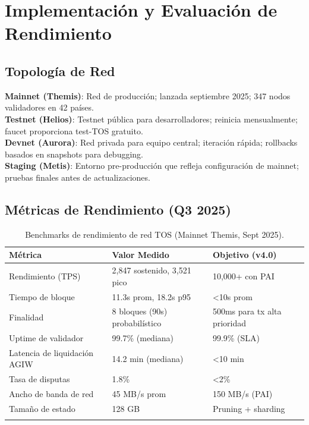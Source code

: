 \documentclass[11pt]{article}
\begin{document}
\section{Implementación y Evaluación de Rendimiento}
\label{sec:implementation}

\subsection{Topología de Red}

\textbf{Mainnet (Themis)}: Red de producción; lanzada septiembre 2025; 347 nodos validadores en 42 países.\\
\textbf{Testnet (Helios)}: Testnet pública para desarrolladores; reinicia mensualmente; faucet proporciona test-TOS gratuito.\\
\textbf{Devnet (Aurora)}: Red privada para equipo central; iteración rápida; rollbacks basados en snapshots para debugging.\\
\textbf{Staging (Metis)}: Entorno pre-producción que refleja configuración de mainnet; pruebas finales antes de actualizaciones.

\subsection{Métricas de Rendimiento (Q3 2025)}

\begin{longtable}{@{}p{}p{}p{}@{}}
\toprule
\textbf{Métrica} & \textbf{Valor Medido} & \textbf{Objetivo (v4.0)} \\\midrule
Rendimiento (TPS) & 2,847 sostenido, 3,521 pico & 10,000+ con PAI \\
Tiempo de bloque & 11.3s prom, 18.2s p95 & <10s prom \\
Finalidad & 8 bloques (90s) probabilístico & 500ms para tx alta prioridad \\
Uptime de validador & 99.7\% (mediana) & 99.9\% (SLA) \\
Latencia de liquidación AGIW & 14.2 min (mediana) & <10 min \\
Tasa de disputas & 1.8\% & <2\% \\
Ancho de banda de red & 45 MB/s prom & 150 MB/s (PAI) \\
Tamaño de estado & 128 GB & Pruning + sharding \\
\bottomrule
\caption{Benchmarks de rendimiento de red TOS (Mainnet Themis, Sept 2025).}
\end{longtable}
\end{document}
